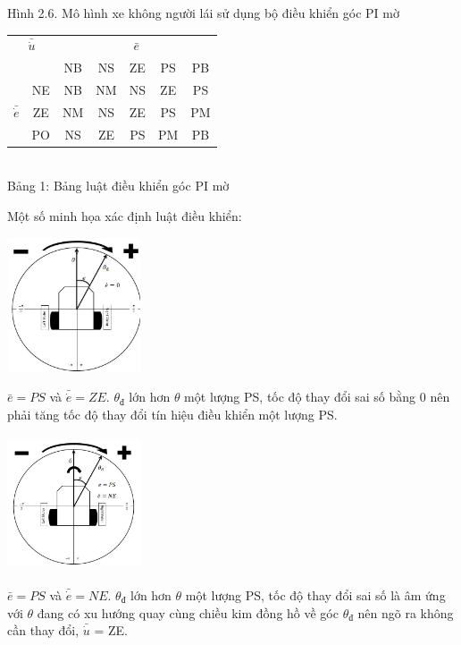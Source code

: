 \documentclass[a4paper, 12pt]{article}
\begin{document}
\begin{enumerate}
\begin{center}
			Hình 2.6. Mô hình xe không người lái sử dụng bộ điều khiển góc PI mờ
		\end{center}
		\begin{center}
			\begin{tabular}{|c|c|c|c|c|c|c|}
				\hline
				\multicolumn{2}{|c|}{$\bar{\dot{u}}$} & \multicolumn{5}{c}{$\bar{e}$} \vline \\\cline{3-7}
				\multicolumn{2}{|c|}{} \vline& NB & NS & ZE & PS & PB \\\hline
				& NE & NB & NM & NS & ZE & PS \\\cline{2-7}
				$\bar{\dot{e}}$ & ZE & NM &NS & ZE & PS & PM \\\cline{2-7}
				& PO & NS & ZE & PS & PM & PB \\\hline
			\end{tabular}\\\vspace{0.5cm} 
			Bảng 1: Bảng luật điều khiển góc PI mờ
		\end{center}
		Một số minh họa xác định luật điều khiển:\\
		\begin{center}
			\includegraphics[width=150px,height=150px]{images/Case1}
		\end{center}
		$\bar{e} = PS$ và $\bar{\dot{e}} = ZE$. $\theta_{đ}$ lớn hơn $\theta$ một lượng PS, tốc độ thay đổi sai số bằng 0 nên phải tăng tốc độ thay đổi tín hiệu điều khiển một lượng PS.\\
		\begin{center}
			\includegraphics[width=150px,height=150px]{images/Case2}
		\end{center}
		$\bar{e} = PS$ và $\bar{\dot{e}} = NE$. $\theta_{đ}$ lớn hơn $\theta$ một lượng PS, tốc độ thay đổi sai số là âm ứng với $\theta$ đang có xu hướng quay cùng chiều kim đồng hồ về góc $\theta_{đ}$ nên ngõ ra không cần thay đổi, $\bar{\dot{u}}$ = ZE.\\

\end{enumerate}
\end{document}
